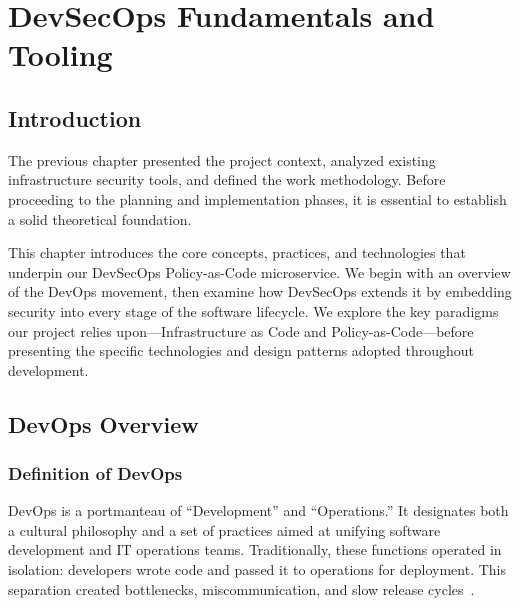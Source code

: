 
\chapter{DevSecOps Fundamentals and Tooling}

\section{Introduction}

The previous chapter presented the project context, analyzed existing infrastructure security tools, and defined the work methodology. Before proceeding to the planning and implementation phases, it is essential to establish a solid theoretical foundation.

This chapter introduces the core concepts, practices, and technologies that underpin our DevSecOps Policy-as-Code microservice. We begin with an overview of the DevOps movement, then examine how DevSecOps extends it by embedding security into every stage of the software lifecycle. We explore the key paradigms our project relies upon—Infrastructure as Code and Policy-as-Code—before presenting the specific technologies and design patterns adopted throughout development.

\section{DevOps Overview}

\subsection{Definition of DevOps}

DevOps is a portmanteau of ``Development'' and ``Operations.'' It designates both a cultural philosophy and a set of practices aimed at unifying software development and IT operations teams. Traditionally, these functions operated in isolation: developers wrote code and passed it to operations for deployment. This separation created bottlenecks, miscommunication, and slow release cycles~\cite{devopshandbook}.

